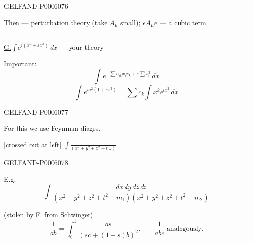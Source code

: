\begin{GelfandAdjacentEvidence}{GELFAND-P000607}{6}


Then — perturbation theory (take \(A_\mu\) small); \(eA_\mu e\) — a cubic term

\rule{.22\linewidth}{.4pt}\par
\underline{G.}\qquad \(\int e^{i(x^2+\varepsilon x^3)}\,dx\) — your theory

Important:
\[
\int e^{-\sum a_{ik}x_ix_k+\varepsilon\sum x_i^3}\,dx
\]
\[
\int e^{ix^2(1+\varepsilon x^3)}=\sum c_k\int x^k e^{ix^2}\,dx
\]
\end{GelfandAdjacentEvidence}
\begin{GelfandAdjacentEvidence}{GELFAND-P000607}{7}


For this we use Feynman diagrs.

[crossed out at left] \(\int\frac{\phantom{dx}}{(x^2+y^2+z^2+t\ldots)}\)
\end{GelfandAdjacentEvidence}
\begin{GelfandAdjacentEvidence}{GELFAND-P000607}{8}


E.g.
\[
\int\frac{dx\,dy\,dz\,dt}
{(x^2+y^2+z^2+t^2+m_1)(x^2+y^2+z^2+t^2+m_2)}
\]
\end{GelfandAdjacentEvidence}

(stolen by F. from Schwinger)
\[
\frac1{ab}=\int_0^1\frac{ds}{(sa+(1-s)b)^2}.\qquad
\frac1{abc}\text{ analogously.}
\]


